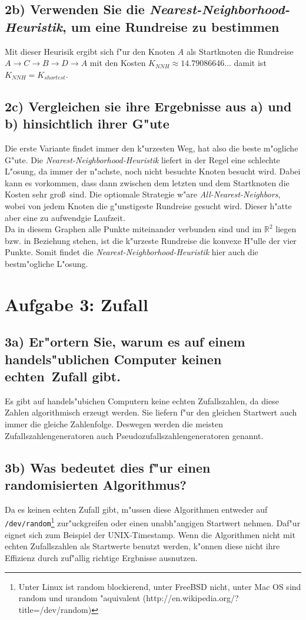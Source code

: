 \documentclass{scrartcl}
\begin{document}
\subsection*{2b) Verwenden Sie die 
\textit{Nearest-Neighborhood-Heuristik}, um eine Rundreise zu bestimmen}
Mit dieser Heurisik ergibt sich f"ur den Knoten $A$ als Startknoten die 
Rundreise 
$A \rightarrow C \rightarrow B \rightarrow D \rightarrow A$ mit den Kosten 
$K_{NNH} \approx 14.79086646\ldots$ damit ist $K_{NNH} = 
K_{shortest}$. 

\subsection*{2c) Vergleichen sie ihre Ergebnisse aus a) und b) hinsichtlich 
ihrer G"ute}
Die erste Variante findet immer den k"urzesten Weg, hat also die beste 
m"ogliche 
G"ute. Die \textit{Nearest-Neighborhood-Heuristik} liefert in der Regel eine 
schlechte L"osung, da immer der n"achste, noch nicht besuchte Knoten 
besucht 
wird. Dabei kann es vorkommen, dass dann zwischen dem letzten und dem 
Startknoten die Kosten sehr gro\ss ~sind. Die optiomale Strategie w"are 
\textit{All-Nearest-Neighbors}, wobei von jedem Knoten die g"unstigeste 
Rundreise gesucht wird. Dieser h"atte aber eine zu aufwendgie Laufzeit. \\
Da in diesem Graphen alle Punkte miteinander verbunden sind und im 
$\mathbb{R}^2$ liegen bzw. in Beziehung stehen, ist die k"urzeste 
Rundreise die konvexe H"ulle der vier Punkte. Somit findet die 
\textit{Nearest-Neighborhood-Heuristik} hier 
auch die bestm"ogliche L"osung.

\section*{Aufgabe 3: Zufall}
\subsection*{3a) Er"ortern Sie, warum es auf einem handels"ublichen 
Computer keinen \dq echten\dq ~Zufall gibt.}
Es gibt auf handels"ubichen Computern keine echten Zufallszahlen, da 
diese Zahlen algorithmisch erzeugt werden. Sie liefern f"ur den gleichen 
Startwert auch 
immer 
die gleiche Zahlenfolge. Deswegen werden die meisten 
Zufallszahlengeneratoren 
auch Pseudozufallszahlengeneratoren genannt. 

\subsection*{3b) Was bedeutet dies f"ur einen randomisierten 
Algorithmus?}
Da es keinen echten Zufall gibt, m"ussen diese Algorithmen entweder auf 
\texttt{/dev/random}\footnote{Unter Linux ist random blockierend, unter 
FreeBSD nicht, unter Mac OS sind random und urandom "aquivalent 
(http://en.wikipedia.org/?title=/dev/random)} zur"uckgreifen oder einen 
unabh"angigen Startwert 
nehmen. 
Daf"ur eignet sich zum Beispiel der UNIX-Timestamp. Wenn die 
Algorithmen nicht 
mit echten Zufallszahlen als Startwerte benutzt werden, k"onnen diese nicht 
ihre 
Effizienz durch zuf"allig richtige Ergbnisse ausnutzen.
\end{document}
